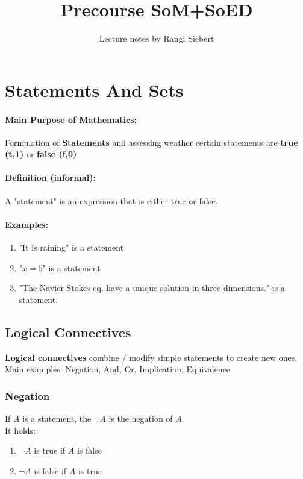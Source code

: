 \documentclass[twocolumn]{article}
\begin{document}
\title{Precourse SoM+SoED}
\author{Lecture notes by Rangi Siebert}
\maketitle
\tableofcontents

\section{Statements And Sets}
			\paragraph{Main Purpose of Mathematics:}
			Formulation of \textbf{Statements} and assessing weather certain 
			statements are \textbf{true (t,1)} or \textbf{false (f,0)} 

			\paragraph{Definition (informal):}
			A "statement" is an expression that is either true or false.

			\paragraph{Examples:}
			\begin{enumerate}
				\item "It is raining" is a statement
				\item "$x=5$" is a statement
				\item "The Navier-Stokes eq. have a unique solution in 
					three dimensions." is a statement.
			\end{enumerate}

	\subsection{Logical Connectives}
		\textbf{Logical connectives} combine / modify simple statements to 
		create new ones. Main examples: Negation, And, Or, Implication, Equivalence

		\subsubsection{Negation}
			If $A$ is a statement, the $\neg A$ is the negation of $A$.\\
			It holds:
			\begin{enumerate}
				\item $\neg A$ is true if $A$ is false
				\item $\neg A$ is false if $A$ is true
			\end{enumerate}
\end{document}
